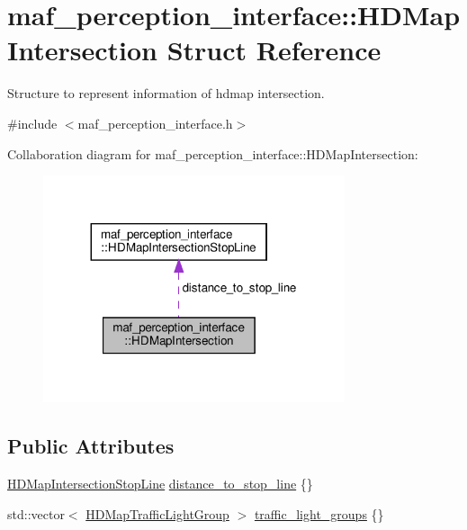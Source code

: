 \hypertarget{structmaf__perception__interface_1_1HDMapIntersection}{}\section{maf\+\_\+perception\+\_\+interface\+:\+:H\+D\+Map\+Intersection Struct Reference}
\label{structmaf__perception__interface_1_1HDMapIntersection}


Structure to represent information of hdmap intersection.  




{\ttfamily \#include $<$maf\+\_\+perception\+\_\+interface.\+h$>$}



Collaboration diagram for maf\+\_\+perception\+\_\+interface\+:\+:H\+D\+Map\+Intersection\+:\nopagebreak
\begin{figure}[H]
\begin{center}
\leavevmode
\includegraphics[width=251pt]{structmaf__perception__interface_1_1HDMapIntersection__coll__graph}
\end{center}
\end{figure}
\subsection*{Public Attributes}
\begin{DoxyCompactItemize}
\item 
\hyperlink{structmaf__perception__interface_1_1HDMapIntersectionStopLine}{H\+D\+Map\+Intersection\+Stop\+Line} \hyperlink{structmaf__perception__interface_1_1HDMapIntersection_a990b23719134b33a19ac21ec376c6eff}{distance\+\_\+to\+\_\+stop\+\_\+line} \{\}
\item 
std\+::vector$<$ \hyperlink{structmaf__perception__interface_1_1HDMapTrafficLightGroup}{H\+D\+Map\+Traffic\+Light\+Group} $>$ \hyperlink{structmaf__perception__interface_1_1HDMapIntersection_a2f6724b0c24b34518198d899ac3174c2}{traffic\+\_\+light\+\_\+groups} \{\}
\end{DoxyCompactItemize}


